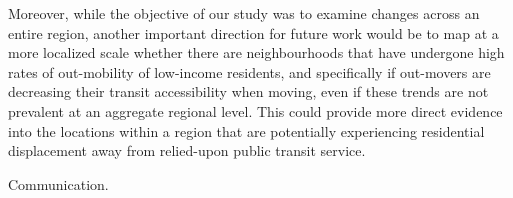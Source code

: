 Moreover, while the objective of our study was to examine changes across an entire region, another important direction for future work would be to map at a more localized scale whether there are neighbourhoods that have undergone high rates of out-mobility of low-income residents, and specifically if out-movers are decreasing their transit accessibility when moving, even if these trends are not prevalent at an aggregate regional level. This could provide more direct evidence into the locations within a region that are potentially experiencing residential displacement away from relied-upon public transit service.

Communication.



%
%
%
%
%
%
%
%

















